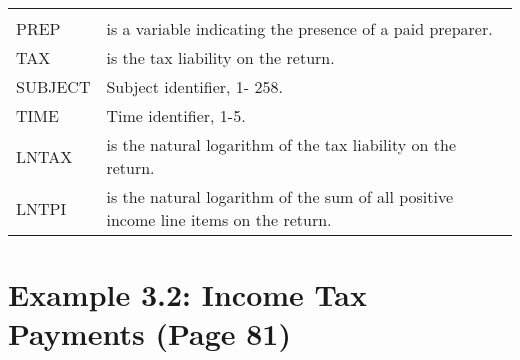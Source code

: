 \documentclass[]{book}
\begin{document}
\begin{longtable}[]{@{}ll@{}}
\begin{minipage}[t]{0.88\columnwidth}
\end{minipage}\tabularnewline
\begin{minipage}[t]{0.06\columnwidth}\raggedright
PREP\strut
\end{minipage} & \begin{minipage}[t]{0.88\columnwidth}\raggedright
is a variable indicating the presence of a paid preparer.\strut
\end{minipage}\tabularnewline
\begin{minipage}[t]{0.06\columnwidth}\raggedright
TAX\strut
\end{minipage} & \begin{minipage}[t]{0.88\columnwidth}\raggedright
is the tax liability on the return.\strut
\end{minipage}\tabularnewline
\begin{minipage}[t]{0.06\columnwidth}\raggedright
SUBJECT\strut
\end{minipage} & \begin{minipage}[t]{0.88\columnwidth}\raggedright
Subject identifier, 1- 258.\strut
\end{minipage}\tabularnewline
\begin{minipage}[t]{0.06\columnwidth}\raggedright
TIME\strut
\end{minipage} & \begin{minipage}[t]{0.88\columnwidth}\raggedright
Time identifier, 1-5.\strut
\end{minipage}\tabularnewline
\begin{minipage}[t]{0.06\columnwidth}\raggedright
LNTAX\strut
\end{minipage} & \begin{minipage}[t]{0.88\columnwidth}\raggedright
is the natural logarithm of the tax liability on the return.\strut
\end{minipage}\tabularnewline
\begin{minipage}[t]{0.06\columnwidth}\raggedright
LNTPI\strut
\end{minipage} & \begin{minipage}[t]{0.88\columnwidth}\raggedright
is the natural logarithm of the sum of all positive income line items on the return.\strut
\end{minipage}\tabularnewline
\bottomrule
\end{longtable}

\hypertarget{example-3.2-income-tax-payments-page-81}{%
\section{Example 3.2: Income Tax Payments (Page 81)}\label{example-3.2-income-tax-payments-page-81}}
\end{document}
